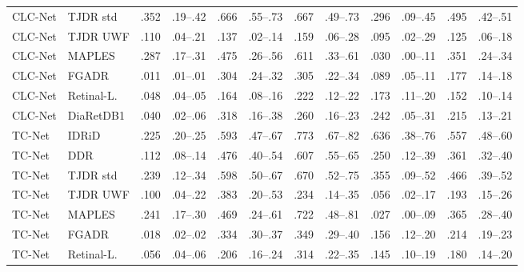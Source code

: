 \begin{landscape}
{\begin{longtable}{l l c c c c c c c c c c}
CLC-Net & TJDR std & .352 & \scriptsize .19--.42 & .666 & \scriptsize .55--.73 & .667 & \scriptsize .49--.73 & .296 & \scriptsize .09--.45 & .495 & \scriptsize .42--.51 \\
CLC-Net & TJDR UWF & .110 & \scriptsize .04--.21 & .137 & \scriptsize .02--.14 & .159 & \scriptsize .06--.28 & .095 & \scriptsize .02--.29 & .125 & \scriptsize .06--.18 \\
CLC-Net & MAPLES & .287 & \scriptsize .17--.31 & .475 & \scriptsize .26--.56 & .611 & \scriptsize .33--.61 & .030 & \scriptsize .00--.11 & .351 & \scriptsize .24--.34 \\
CLC-Net & FGADR & .011 & \scriptsize .01--.01 & .304 & \scriptsize .24--.32 & .305 & \scriptsize .22--.34 & .089 & \scriptsize .05--.11 & .177 & \scriptsize .14--.18 \\
CLC-Net & Retinal-L. & .048 & \scriptsize .04--.05 & .164 & \scriptsize .08--.16 & .222 & \scriptsize .12--.22 & .173 & \scriptsize .11--.20 & .152 & \scriptsize .10--.14 \\
CLC-Net & DiaRetDB1 & .040 & \scriptsize .02--.06 & .318 & \scriptsize .16--.38 & .260 & \scriptsize .16--.23 & .242 & \scriptsize .05--.31 & .215 & \scriptsize .13--.21 \\
TC-Net & IDRiD & .225 & \scriptsize .20--.25 & .593 & \scriptsize .47--.67 & .773 & \scriptsize .67--.82 & .636 & \scriptsize .38--.76 & .557 & \scriptsize .48--.60 \\
TC-Net & DDR & .112 & \scriptsize .08--.14 & .476 & \scriptsize .40--.54 & .607 & \scriptsize .55--.65 & .250 & \scriptsize .12--.39 & .361 & \scriptsize .32--.40 \\
TC-Net & TJDR std & .239 & \scriptsize .12--.34 & .598 & \scriptsize .50--.67 & .670 & \scriptsize .52--.75 & .355 & \scriptsize .09--.52 & .466 & \scriptsize .39--.52 \\
TC-Net & TJDR UWF & .100 & \scriptsize .04--.22 & .383 & \scriptsize .20--.53 & .234 & \scriptsize .14--.35 & .056 & \scriptsize .02--.17 & .193 & \scriptsize .15--.26 \\
TC-Net & MAPLES & .241 & \scriptsize .17--.30 & .469 & \scriptsize .24--.61 & .722 & \scriptsize .48--.81 & .027 & \scriptsize .00--.09 & .365 & \scriptsize .28--.40 \\
TC-Net & FGADR & .018 & \scriptsize .02--.02 & .334 & \scriptsize .30--.37 & .349 & \scriptsize .29--.40 & .156 & \scriptsize .12--.20 & .214 & \scriptsize .19--.23 \\
TC-Net & Retinal-L. & .056 & \scriptsize .04--.06 & .206 & \scriptsize .16--.24 & .314 & \scriptsize .22--.35 & .145 & \scriptsize .10--.19 & .180 & \scriptsize .14--.20 \\

\end{longtable}}
\end{landscape}
